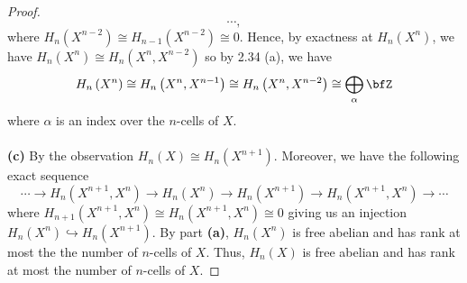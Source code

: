 \begin{proof}
\begin{equation}
\cdots,
\end{equation}
where $H_n\left(X^{n-2}\right)\cong H_{n-1}\left(X^{n-2}\right)\cong
0$. Hence, by exactness at $H_n\left(X^n\right)$, we have
$H_n\left(X^n\right)\cong H_n\left(X^n,X^{n-2}\right)$ so by 2.34 (a), we
have
\[
H_n\left(X^n\right)\cong
H_n\left(X^n,X^{n-1}\right)\cong
H_n\left(X^n,X^{n-2}\right)\cong\bigoplus_\alpha\bfZ
\]
where $\alpha$ is an index over the $n$-cells of $X$.
\\\\
\textbf{(c)} By the observation $H_n(X)\cong
H_n\left(X^{n+1}\right)$. Moreover, we have the following exact sequence
\begin{equation}
  \label{eq:short-exact-cells-2}
\cdots\longrightarrow
H_n\left(X^{n+1},X^n\right)\longrightarrow
H_n\left(X^n\right)\longrightarrow
H_n\left(X^{n+1}\right)\longrightarrow
H_n\left(X^{n+1},X^n\right)\longrightarrow\cdots
\end{equation}
where $H_{n+1}\left(X^{n+1},X^n\right)\cong
H_n\left(X^{n+1},X^n\right)\cong 0$ giving us an injection
$H_n\left(X^n\right)\hookrightarrow H_n\left(X^{n+1}\right)$. By part
\textbf{(a)}, $H_n\left(X^n\right)$ is free abelian and has rank at most
the the number of $n$-cells of $X$. Thus, $H_n\left(X\right)$ is free abelian
and has rank at most the number of $n$-cells of $X$.
\end{proof}
\newpage

